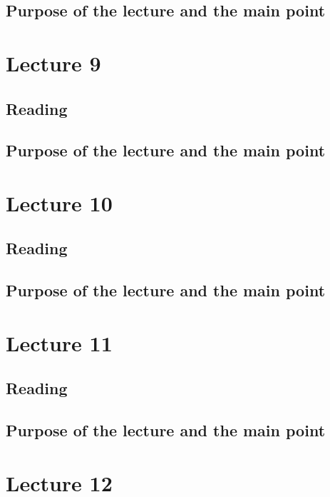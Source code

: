 \subsection{Purpose of the lecture and the main point}

\section{Lecture 9}

\subsection{Reading}


\subsection{Purpose of the lecture and the main point}


\section{Lecture 10}

\subsection{Reading}


\subsection{Purpose of the lecture and the main point}

\section{Lecture 11}

\subsection{Reading}


\subsection{Purpose of the lecture and the main point}



\section{Lecture 12}



